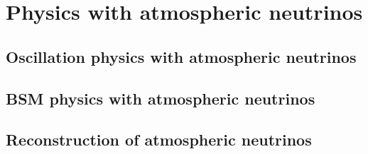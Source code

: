 \section{Physics with atmospheric neutrinos}
\label{sec:nonaccel-atm}

\subsection{Oscillation physics with atmospheric neutrinos}
\label{sec:nonaccel-atm-oscillations}

\subsection{BSM physics with atmospheric neutrinos}
\label{sec:nonaccel-atm-bsm}

\subsection{Reconstruction of atmospheric neutrinos}
\label{sec:nonaccel-atm-reco}
